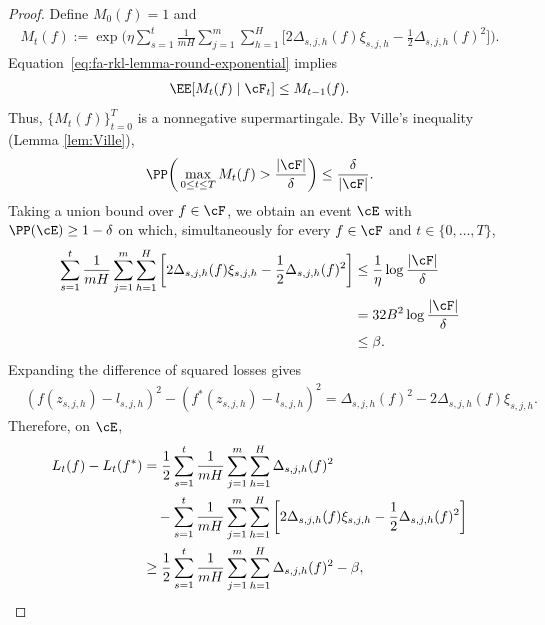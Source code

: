 \documentclass[11pt]{article}
\begin{document}
\begin{proof}
Define $M_0(f)=1$ and
\begin{align*}
    M_t(f)
    :=
    \exp\bigg(
        \eta
        \sum_{s=1}^t
        \frac1{mH}
        \sum_{j=1}^m\sum_{h=1}^H
        \bigg[
            2\Delta_{s,j,h}(f)\xi_{s,j,h}
            -
            \frac12\Delta_{s,j,h}(f)^2
        \bigg]
    \bigg).
\end{align*}
Equation~\eqref{eq:fa-rkl-lemma-round-exponential}
implies
\begin{align*}
    \EE[M_t(f)\mid\cF_t]
    \leq M_{t-1}(f).
\end{align*}
Thus, $\{M_t(f)\}_{t=0}^T$ is a nonnegative supermartingale. By Ville's inequality (Lemma \ref{lem:Ville}),
\begin{align*}
    \PP\bigg(
        \max_{0\leq t\leq T}M_t(f)
        >
        \frac{|\cF|}{\delta}
    \bigg)
    \leq
    \frac{\delta}{|\cF|}.
\end{align*}
Taking a union bound over $f\in\cF$, we obtain an event
$\cE$ with $\PP(\cE)\geq1-\delta$ on which,
simultaneously for every $f\in\cF$ and $t\in\{0,\ldots,T\}$,
\begin{align}
    \sum_{s=1}^t
    \frac1{mH}
    \sum_{j=1}^m\sum_{h=1}^H
    \bigg[
        2\Delta_{s,j,h}(f)\xi_{s,j,h}
        -
        \frac12\Delta_{s,j,h}(f)^2
    \bigg]
    &\leq
    \frac1\eta\log\frac{|\cF|}{\delta}
    \notag\\\notag
    &= 32B^2 \log\frac{|\cF|}{\delta}\\
    &\leq\beta.
    \label{eq:fa-rkl-lemma-uniform-noise}
\end{align}
Expanding the difference of squared losses gives
\begin{align*}
    &(f(z_{s,j,h})-l_{s,j,h})^2
    -
    (f^*(z_{s,j,h})-l_{s,j,h})^2=
    \Delta_{s,j,h}(f)^2
    -
    2\Delta_{s,j,h}(f)\xi_{s,j,h}.
\end{align*}
Therefore, on $\cE$,
\begin{align}
    L_t(f)-L_t(f^*)
    &=
    \frac12
    \sum_{s=1}^t\frac1{mH}
    \sum_{j=1}^m\sum_{h=1}^H
    \Delta_{s,j,h}(f)^2
    \notag\\
    &\quad-
    \sum_{s=1}^t\frac1{mH}
    \sum_{j=1}^m\sum_{h=1}^H
    \bigg[
        2\Delta_{s,j,h}(f)\xi_{s,j,h}
        -
        \frac12\Delta_{s,j,h}(f)^2
    \bigg]
    \notag\\
    &\geq
    \frac12
    \sum_{s=1}^t\frac1{mH}
    \sum_{j=1}^m\sum_{h=1}^H
    \Delta_{s,j,h}(f)^2
    -
    \beta,
    \label{eq:fa-rkl-lemma-regression-bound}
\end{align}

\end{proof}
\end{document}
